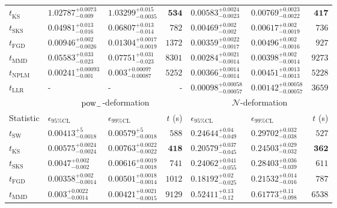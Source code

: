 \begin{tabular}{l|llr|llr}
	$t_{\overline{\mathrm{KS}}}$ & $1.02787_{-0.009}^{+0.0073}$ & $1.03299_{-0.0035}^{+0.015}$ & ${\mathbf{534}}$ & $0.00583_{-0.0023}^{+0.0024}$ & $0.00769_{-0.0022}^{+0.0023}$ & ${\mathbf{417}}$ \\
	$t_{\mathrm{SKS}}$ & $0.04981_{-0.016}^{+0.013}$ & $0.06807_{-0.014}^{+0.013}$ & $782$ & $0.00469_{-0.002}^{+0.002}$ & $0.00617_{-0.0019}^{+0.002}$ & $736$ \\
	$t_{\mathrm{FGD}}$ & ${\mathbf{0.00946_{-0.0026}^{+0.002}}}$ & ${\mathbf{0.01304_{-0.0019}^{+0.0017}}}$ & $1372$ & $0.00359_{-0.0017}^{+0.0022}$ & $0.00496_{-0.0016}^{+0.002}$ & $927$ \\
	$t_{\mathrm{MMD}}$ & $0.05583_{-0.023}^{+0.033}$ & $0.07751_{-0.023}^{+0.031}$ & $8301$ & ${\mathbf{0.00284_{-0.0014}^{+0.0021}}}$ & ${\mathbf{0.00398_{-0.0014}^{+0.002}}}$ & $9273$ \\
\rowcolor{red!35}	$t_{\mathrm{NPLM}}$ & $0.00241_{-0.001}^{+0.00093}$ & $0.003_{-0.00087}^{+0.00097}$ & $5252$ & $0.00366_{-0.0014}^{+0.0014}$ & $0.00451_{-0.0013}^{+0.0013}$ & $5228$ \\
	$t_{\mathrm{LLR}}$ & - & - & - & $0.00098_{-0.00057}^{+0.00058}$ & $0.00142_{-0.00057}^{+0.00058}$ & $3659$ \\
	\toprule
	\multicolumn{1}{c}{} & \multicolumn{3}{c}{$\rm{pow}_{-}$-deformation} & \multicolumn{3}{c}{$\mathcal{N}$-deformation} \\
	Statistic & $\epsilon_{95\%\mathrm{CL}}$ & $\epsilon_{99\%\mathrm{CL}}$ & $t$ (s) & $\epsilon_{95\%\mathrm{CL}}$ & $\epsilon_{99\%\mathrm{CL}}$ & $t$ (s) \\
	\midrule
	$t_{\mathrm{SW}}$ & $0.00413_{-0.0018}^{+5}$ & $0.00579_{-0.0018}^{+5}$ & $588$ & $0.24644_{-0.049}^{+0.04}$ & $0.29702_{-0.038}^{+0.032}$ & $527$ \\
	$t_{\overline{\mathrm{KS}}}$ & $0.00575_{-0.0024}^{+0.0024}$ & $0.00763_{-0.0022}^{+0.0022}$ & ${\mathbf{418}}$ & $0.20579_{-0.045}^{+0.037}$ & $0.24503_{-0.032}^{+0.029}$ & ${\mathbf{362}}$ \\
	$t_{\mathrm{SKS}}$ & $0.0047_{-0.002}^{+0.002}$ & $0.00616_{-0.0018}^{+0.0019}$ & $741$ & $0.24062_{-0.055}^{+0.041}$ & $0.28403_{-0.039}^{+0.036}$ & $611$ \\
	$t_{\mathrm{FGD}}$ & $0.00358_{-0.0014}^{+0.002}$ & $0.00501_{-0.0014}^{+0.0018}$ & $1012$ & ${\mathbf{0.18192_{-0.025}^{+0.02}}}$ & ${\mathbf{0.21532_{-0.016}^{+0.014}}}$ & $787$ \\
	$t_{\mathrm{MMD}}$ & ${\mathbf{0.003_{-0.0014}^{+0.0022}}}$ & ${\mathbf{0.00421_{-0.0015}^{+0.0021}}}$ & $9129$ & $0.52411_{-0.12}^{+0.13}$ & $0.61773_{-0.098}^{+0.11}$ & $6538$ \\

\end{tabular}
